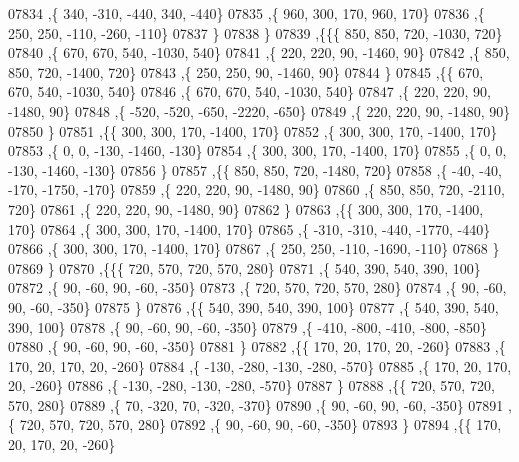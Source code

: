 \begin{DoxyCode}
07834     ,\{   340,  -310,  -440,   340,  -440\}
07835     ,\{   960,   300,   170,   960,   170\}
07836     ,\{   250,   250,  -110,  -260,  -110\}
07837     \}
07838    \}
07839   ,\{\{\{   850,   850,   720, -1030,   720\}
07840     ,\{   670,   670,   540, -1030,   540\}
07841     ,\{   220,   220,    90, -1460,    90\}
07842     ,\{   850,   850,   720, -1400,   720\}
07843     ,\{   250,   250,    90, -1460,    90\}
07844     \}
07845    ,\{\{   670,   670,   540, -1030,   540\}
07846     ,\{   670,   670,   540, -1030,   540\}
07847     ,\{   220,   220,    90, -1480,    90\}
07848     ,\{  -520,  -520,  -650, -2220,  -650\}
07849     ,\{   220,   220,    90, -1480,    90\}
07850     \}
07851    ,\{\{   300,   300,   170, -1400,   170\}
07852     ,\{   300,   300,   170, -1400,   170\}
07853     ,\{     0,     0,  -130, -1460,  -130\}
07854     ,\{   300,   300,   170, -1400,   170\}
07855     ,\{     0,     0,  -130, -1460,  -130\}
07856     \}
07857    ,\{\{   850,   850,   720, -1480,   720\}
07858     ,\{   -40,   -40,  -170, -1750,  -170\}
07859     ,\{   220,   220,    90, -1480,    90\}
07860     ,\{   850,   850,   720, -2110,   720\}
07861     ,\{   220,   220,    90, -1480,    90\}
07862     \}
07863    ,\{\{   300,   300,   170, -1400,   170\}
07864     ,\{   300,   300,   170, -1400,   170\}
07865     ,\{  -310,  -310,  -440, -1770,  -440\}
07866     ,\{   300,   300,   170, -1400,   170\}
07867     ,\{   250,   250,  -110, -1690,  -110\}
07868     \}
07869    \}
07870   ,\{\{\{   720,   570,   720,   570,   280\}
07871     ,\{   540,   390,   540,   390,   100\}
07872     ,\{    90,   -60,    90,   -60,  -350\}
07873     ,\{   720,   570,   720,   570,   280\}
07874     ,\{    90,   -60,    90,   -60,  -350\}
07875     \}
07876    ,\{\{   540,   390,   540,   390,   100\}
07877     ,\{   540,   390,   540,   390,   100\}
07878     ,\{    90,   -60,    90,   -60,  -350\}
07879     ,\{  -410,  -800,  -410,  -800,  -850\}
07880     ,\{    90,   -60,    90,   -60,  -350\}
07881     \}
07882    ,\{\{   170,    20,   170,    20,  -260\}
07883     ,\{   170,    20,   170,    20,  -260\}
07884     ,\{  -130,  -280,  -130,  -280,  -570\}
07885     ,\{   170,    20,   170,    20,  -260\}
07886     ,\{  -130,  -280,  -130,  -280,  -570\}
07887     \}
07888    ,\{\{   720,   570,   720,   570,   280\}
07889     ,\{    70,  -320,    70,  -320,  -370\}
07890     ,\{    90,   -60,    90,   -60,  -350\}
07891     ,\{   720,   570,   720,   570,   280\}
07892     ,\{    90,   -60,    90,   -60,  -350\}
07893     \}
07894    ,\{\{   170,    20,   170,    20,  -260\}

\end{DoxyCode}
